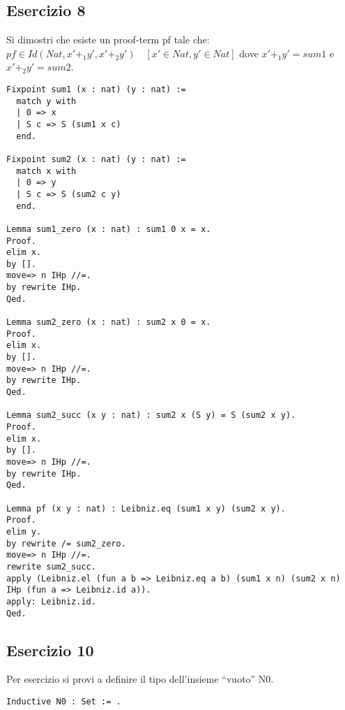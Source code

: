 \subsection{Esercizio 8}

Si dimostri che esiste un proof-term pf tale che:
$pf \in Id(Nat, x' +_1 y', x' +_2 y') \quad [x' \in Nat, y' \in Nat]$
dove $x' +_1 y' = sum1$ e $x' +_2 y' = sum2$.

\begin{lstlisting}[language=Coq]
Fixpoint sum1 (x : nat) (y : nat) :=
  match y with
  | 0 => x
  | S c => S (sum1 x c)
  end.

Fixpoint sum2 (x : nat) (y : nat) :=
  match x with
  | 0 => y
  | S c => S (sum2 c y)
  end.

Lemma sum1_zero (x : nat) : sum1 0 x = x.
Proof.
elim x.
by [].
move=> n IHp //=.
by rewrite IHp.
Qed.

Lemma sum2_zero (x : nat) : sum2 x 0 = x.
Proof.
elim x.
by [].
move=> n IHp //=.
by rewrite IHp.
Qed.

Lemma sum2_succ (x y : nat) : sum2 x (S y) = S (sum2 x y).
Proof.
elim x.
by [].
move=> n IHp //=.
by rewrite IHp.
Qed.

Lemma pf (x y : nat) : Leibniz.eq (sum1 x y) (sum2 x y).
Proof.
elim y.
by rewrite /= sum2_zero.
move=> n IHp //=.
rewrite sum2_succ.
apply (Leibniz.el (fun a b => Leibniz.eq a b) (sum1 x n) (sum2 x n) IHp (fun a => Leibniz.id a)).
apply: Leibniz.id.
Qed.
\end{lstlisting}

\subsection{Esercizio 10}

Per esercizio si provi a definire il tipo dell'insieme ``vuoto'' N0.

\begin{lstlisting}[language=Coq]
Inductive N0 : Set := .
\end{lstlisting}